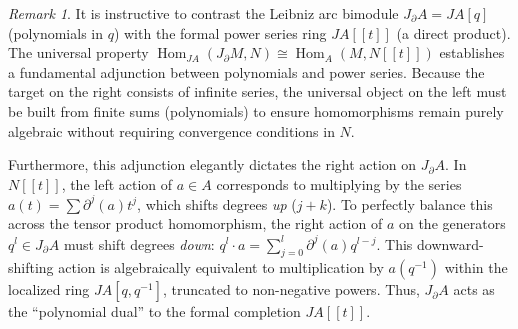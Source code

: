 \documentclass[a4paper, 12pt]{amsart}
\theoremstyle{definition}
\theoremstyle{remark}
\newtheorem{remark}[theorem]{Remark}
\begin{document}
\begin{remark}
  \label{rmk:duality-polynomial-series}
  It is instructive to contrast the Leibniz arc bimodule $J_\partial A = JA[q]$ (polynomials in $q$) with the formal power series ring $JA[[t]]$ (a direct product). The universal property $\operatorname{Hom}_{JA}(J_\partial M, N) \cong \operatorname{Hom}_A(M, N[[t]])$ establishes a fundamental adjunction between polynomials and power series. Because the target on the right consists of infinite series, the universal object on the left must be built from finite sums (polynomials) to ensure homomorphisms remain purely algebraic without requiring convergence conditions in $N$. 
  
  Furthermore, this adjunction elegantly dictates the right action on $J_\partial A$. In $N[[t]]$, the left action of $a \in A$ corresponds to multiplying by the series $a(t) = \sum \partial^j(a) t^j$, which shifts degrees \emph{up} ($j+k$). To perfectly balance this across the tensor product homomorphism, the right action of $a$ on the generators $q^l \in J_\partial A$ must shift degrees \emph{down}: $q^l \cdot a = \sum_{j=0}^l \partial^j(a) q^{l-j}$. This downward-shifting action is algebraically equivalent to multiplication by $a(q^{-1})$ within the localized ring $JA[q, q^{-1}]$, truncated to non-negative powers. Thus, $J_\partial A$ acts as the ``polynomial dual'' to the formal completion $JA[[t]]$.
\end{remark}
\end{document}
